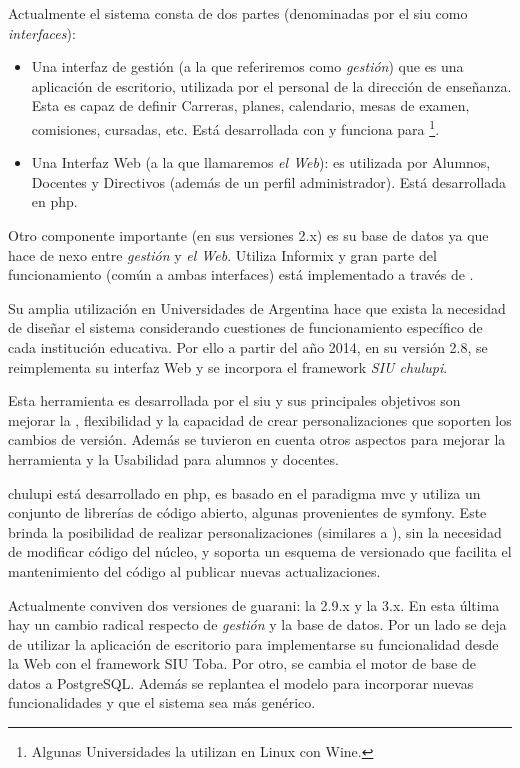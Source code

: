Actualmente el sistema consta de dos partes (denominadas por el \gls{siu} como \textit{interfaces}):
\begin{itemize}
\item Una interfaz de gestión (a la que referiremos como \textit{gestión}) que es una aplicación de escritorio, utilizada por el personal de la dirección de enseñanza. Esta es capaz de definir Carreras, planes, calendario, mesas de examen, comisiones, cursadas, etc. Está desarrollada con  y funciona para \footnote{Algunas Universidades la utilizan en Linux con Wine.}.
\item Una Interfaz Web (a la que llamaremos \textit{el Web}): es utilizada por Alumnos, Docentes y Directivos (además de un perfil administrador). Está desarrollada en \gls{php}. 
\end{itemize}

Otro componente importante (en sus versiones 2.x) es su base de datos ya que hace de nexo entre \textit{gestión} y \textit{el Web}. Utiliza Informix y gran parte del funcionamiento (común a ambas interfaces) está implementado a través de .

Su amplia utilización en Universidades de Argentina hace que exista la necesidad de diseñar el sistema considerando cuestiones de funcionamiento específico de cada institución educativa. Por ello a partir del año 2014, en su versión 2.8, se reimplementa su interfaz Web y se incorpora el \gls{framework} \textit{SIU \gls{chulupi}}.

Esta herramienta es desarrollada por el \gls{siu} y sus principales objetivos son mejorar la , flexibilidad y la capacidad de crear personalizaciones que soporten los cambios de versión. Además se tuvieron en cuenta otros aspectos para mejorar la herramienta y la Usabilidad para alumnos y docentes.

\gls{chulupi} está desarrollado en \gls{php}, es basado en el paradigma \gls{mvc} y utiliza un conjunto de librerías de código abierto, algunas provenientes de \gls{symfony}. Este brinda la posibilidad de realizar personalizaciones (similares a ), sin la necesidad de modificar código del núcleo, y soporta un esquema de versionado que facilita el mantenimiento del código al publicar nuevas actualizaciones\cite{siu2017chulupi}.

Actualmente conviven dos versiones de \gls{guarani}: la 2.9.x y la 3.x. En esta última hay un cambio radical respecto de \textit{gestión} y la base de datos. Por un lado se deja de utilizar la aplicación de escritorio para implementarse su funcionalidad desde la Web con el \gls{framework} SIU Toba. Por otro, se cambia el motor de base de datos a PostgreSQL. Además se replantea el modelo para incorporar nuevas funcionalidades y que el sistema sea más genérico.

